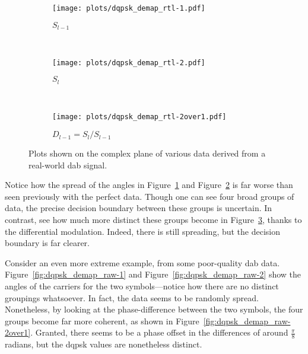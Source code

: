\documentclass[class=report,11pt,crop=false]{standalone}
\begin{document}
\begin{figure}[htbp]
  \centering
  \captionsetup{type=figure}
  \begin{subfigure}[t]{0.3\textwidth}
    \centering
    \captionsetup{type=figure}
    \texttt{[image: plots/dqpsk\_demap\_rtl-1.pdf]}
    \caption{\(S_{l-1}\)}
    \label{fig:dqpsk_demap_rtl-1}
  \end{subfigure}%
  ~ 
  \begin{subfigure}[t]{0.3\textwidth}
    \centering
    \captionsetup{type=figure}
    \texttt{[image: plots/dqpsk\_demap\_rtl-2.pdf]}
    \caption{\(S_{l}\)}
    \label{fig:dqpsk_demap_rtl-2}
  \end{subfigure}
  ~ 
  \begin{subfigure}[t]{0.3\textwidth}
    \centering
    \captionsetup{type=figure}
    \texttt{[image: plots/dqpsk\_demap\_rtl-2over1.pdf]}
    \caption{\(D_{l-1} = S_{l}/S_{l-1}\)}
    \label{fig:dqpsk_demap_rtl-2over1}
  \end{subfigure}
  \caption{Plots shown on the complex plane of various data derived from a real-world \gls{dab} signal.}
  \label{fig:dqpsk_demap_rtl}
\end{figure}

Notice how the spread of the angles in Figure~\ref{fig:dqpsk_demap_rtl-1} and Figure~\ref{fig:dqpsk_demap_rtl-2} is far worse than seen previously with the perfect data. Though one can see four broad groups of data, the precise decision boundary between these groups is uncertain. In contrast, see how much more distinct these groups become in Figure~\ref{fig:dqpsk_demap_rtl-2over1}, thanks to the differential modulation. Indeed, there is still spreading, but the decision boundary is far clearer.

Consider an even more extreme example, from some poor-quality \gls{dab} data. Figure~\ref{fig:dqpsk_demap_raw-1} and Figure~\ref{fig:dqpsk_demap_raw-2} show the angles of the carriers for the two symbols---notice how there are no distinct groupings whatsoever. In fact, the data seems to be randomly spread. Nonetheless, by looking at the phase-difference between the two symbols, the four groups become far more coherent, as shown in Figure~\ref{fig:dqpsk_demap_raw-2over1}. Granted, there seems to be a phase offset in the differences of around \(\frac{\pi}{8}\) radians, but the \gls{dqpsk} values are nonetheless distinct.
\end{document}

